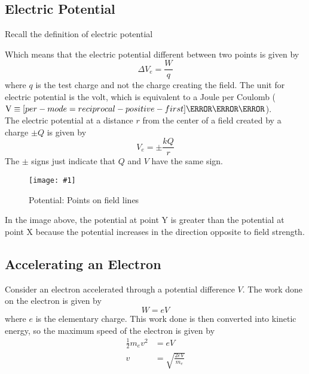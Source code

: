 \documentclass[a4paper,12pt]{article}
\let\oldsi\si
\renewcommand{\si}[1]{\oldsi[per-mode=reciprocal-positive-first]{#1}}
\newcommand{\lb}{\\[8pt]}
\newcommand{\img}[4]{\begin{center}
  \begin{figure}[H]
    \centering
    \texttt{[image: \#1]}
    \caption{#3}
    \label{fig:#4}
  \end{figure}
\end{center}}
\begin{document}
\pagebreak

\subsection{Electric Potential}

Recall the definition of electric potential
\begin{center}
\end{center}
Which means that the electric potential different between two points is given by
\begin{equation}\label{eq:potential}
  \Delta V_e = \frac{W}{q}
\end{equation}
where $q$ is the test charge and not the charge creating the field.
The unit for electric potential is the volt, which is equivalent to a Joule per Coulomb ($\text{V} \equiv \si{\J\per\C}$).\lb
The electric potential at a distance $r$ from the center of a field created by a charge $\pm Q$ is given by
\begin{equation}\label{eq:potential__}
  V_e = \pm \frac{kQ}{r}
\end{equation}
The $\pm$ signs just indicate that $Q$ and $V$ have the same sign.

\img{linespotential.png}{0.5}{Potential: Points on field lines}{linespotential}

In the image above, the potential at point Y is greater than the potential at point X because the potential increases in the direction opposite to field strength.

\pagebreak

\subsection{Accelerating an Electron}

Consider an electron accelerated through a potential difference $V$. The work done on the electron is given by
\begin{equation}\label{eq:work}
  W = eV
\end{equation}
where $e$ is the elementary charge. This work done is then converted into kinetic energy, so the maximum speed of the electron is given by
\begin{align*}
  \frac{1}{2}m_ev^2 & = eV                     \\
  v                 & = \sqrt{\frac{2eV}{m_e}}
\end{align*}
\end{document}

